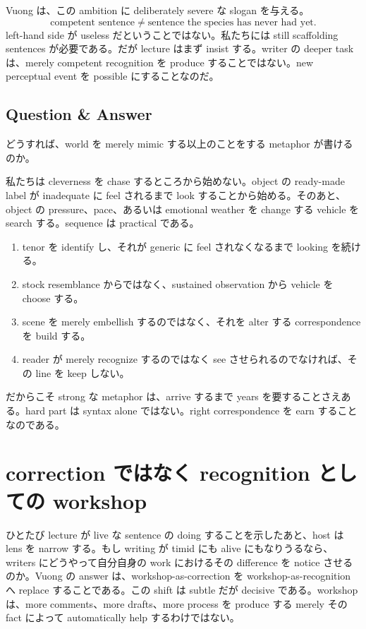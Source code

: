 Vuong は、この ambition に deliberately severe な slogan を与える。
\begin{equation}
\text{competent sentence} \neq \text{sentence the species has never had yet}.
\end{equation}
left-hand side が useless だということではない。私たちには still scaffolding sentences が必要である。だが lecture はまず insist する。writer の deeper task は、merely competent recognition を produce することではない。new perceptual event を possible にすることなのだ。

\subsection{Question \& Answer}

どうすれば、world を merely mimic する以上のことをする metaphor が書けるのか。

私たちは cleverness を chase するところから始めない。object の ready-made label が inadequate に feel されるまで look することから始める。そのあと、object の pressure、pace、あるいは emotional weather を change する vehicle を search する。sequence は practical である。
\begin{enumerate}
\item tenor を identify し、それが generic に feel されなくなるまで looking を続ける。
\item stock resemblance からではなく、sustained observation から vehicle を choose する。
\item scene を merely embellish するのではなく、それを alter する correspondence を build する。
\item reader が merely recognize するのではなく see させられるのでなければ、その line を keep しない。
\end{enumerate}
だからこそ strong な metaphor は、arrive するまで years を要することさえある。hard part は syntax alone ではない。right correspondence を earn することなのである。

\section{correction ではなく recognition としての workshop}

ひとたび lecture が live な sentence の doing することを示したあと、host は lens を narrow する。もし writing が timid にも alive にもなりうるなら、writers にどうやって自分自身の work におけるその difference を notice させるのか。Vuong の answer は、workshop-as-correction を workshop-as-recognition へ replace することである。この shift は subtle だが decisive である。workshop は、more comments、more drafts、more process を produce する merely その fact によって automatically help するわけではない。


